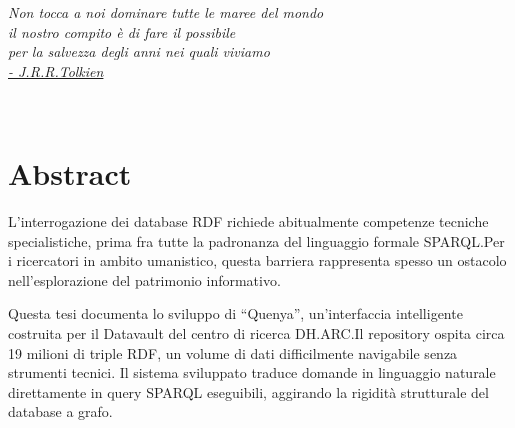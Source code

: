 \documentclass[12pt,a4paper,oneside]{book}
\begin{document}






\topmargin=6.5cm
\begin{flushright}
\emph{
\LARGE{Non tocca a noi dominare tutte le maree del mondo}\\
\LARGE{il nostro compito è di fare il possibile}\\
\LARGE{per la salvezza degli anni nei quali viviamo}\\
\vspace{5mm}
\LARGE{\hyperlink{cite.Tol70}{- J.R.R.Tolkien}} \\
}
\end{flushright}



\newpage~\newpage
\chapter*{Abstract}\label{chap:abstract}
L'interrogazione dei database RDF richiede abitualmente competenze tecniche specialistiche, prima fra tutte la padronanza del linguaggio formale SPARQL.\@ Per i ricercatori in ambito umanistico, questa barriera rappresenta spesso un ostacolo nell'esplorazione del patrimonio informativo.

Questa tesi documenta lo sviluppo di ``Quenya'', un'interfaccia intelligente costruita per il Datavault del centro di ricerca DH.ARC.\@ Il repository ospita circa 19 milioni di triple RDF, un volume di dati difficilmente navigabile senza strumenti tecnici. Il sistema sviluppato traduce domande in linguaggio naturale direttamente in query SPARQL eseguibili, aggirando la rigidità strutturale del database a grafo.
\end{document}
